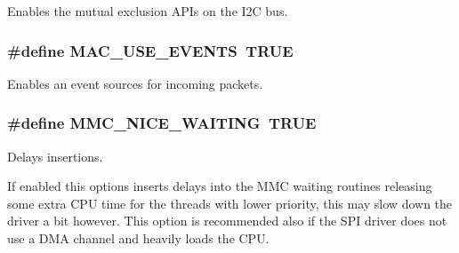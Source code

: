 Enables the mutual exclusion A\+P\+Is on the I2\+C bus. 

\hypertarget{group___h_a_l___c_o_n_f_ga887da1c1383a9e7b45c4464877a7e05e}{}
\subsubsection[{M\+A\+C\+\_\+\+U\+S\+E\+\_\+\+E\+V\+E\+N\+T\+S}]{\setlength{\rightskip}{0pt plus 5cm}\#define M\+A\+C\+\_\+\+U\+S\+E\+\_\+\+E\+V\+E\+N\+T\+S~T\+R\+U\+E}\label{group___h_a_l___c_o_n_f_ga887da1c1383a9e7b45c4464877a7e05e}


Enables an event sources for incoming packets. 

\hypertarget{group___h_a_l___c_o_n_f_ga3087dfffa81dd8a0a80ee92746e65fe2}{}
\subsubsection[{M\+M\+C\+\_\+\+N\+I\+C\+E\+\_\+\+W\+A\+I\+T\+I\+N\+G}]{\setlength{\rightskip}{0pt plus 5cm}\#define M\+M\+C\+\_\+\+N\+I\+C\+E\+\_\+\+W\+A\+I\+T\+I\+N\+G~T\+R\+U\+E}\label{group___h_a_l___c_o_n_f_ga3087dfffa81dd8a0a80ee92746e65fe2}


Delays insertions. 

If enabled this options inserts delays into the M\+M\+C waiting routines releasing some extra C\+P\+U time for the threads with lower priority, this may slow down the driver a bit however. This option is recommended also if the S\+P\+I driver does not use a D\+M\+A channel and heavily loads the C\+P\+U. \hypertarget{group___h_a_l___c_o_n_f_ga6d164ed93ae233b2dc0c35bd19f75224}{}
